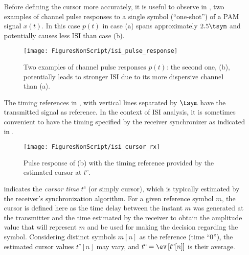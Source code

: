 Before defining the cursor more accurately, it is useful to observe in , two examples
of channel pulse responses to a single symbol (``one-shot'') of a PAM signal $x(t)$.
 In this case $p(t)$ in case (a) spans approximately $2.5 \tsym$ and potentially causes less
ISI than case (b). 

\begin{figure}[htbp]
\centering
\texttt{[image: FiguresNonScript/isi\_pulse\_response]}
\caption{Two examples of channel pulse responses $p(t)$: the second one, (b), potentially leads to stronger ISI due to its more dispersive channel than (a).\label{fig:isi_pulse_response}}
\end{figure}

The timing references in , with vertical lines separated by $\tsym$
have the transmitted signal as reference. In the context of ISI analysis, it
is sometimes convenient to have the timing specified by the receiver 
synchronizer as indicated in .

\begin{figure}[htbp]
\centering
\texttt{[image: FiguresNonScript/isi\_cursor\_rx]}
\caption{Pulse response of (b) with the timing reference
provided by the estimated cursor at $t^c$.\label{fig:isi_cursor_rx}}
\end{figure}

 indicates the \emph{cursor time} $t^c$ (or simply cursor), which is typically estimated by the receiver's synchronization algorithm. 
For a given reference symbol $m$,
the cursor is defined here as the time delay between the instant $m$ was generated at
the transmitter and the time estimated by the receiver to obtain the amplitude value that will
represent $m$ and be used for making the decision regarding the symbol.
Considering distinct symbols $m[n]$ as the reference (time ``0''), the estimated 
cursor values $t^c[n]$ may vary, and $t^c = \ev\left[t^c[n]\right]$ is their average.

